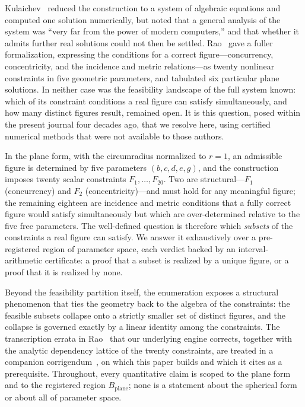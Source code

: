 \documentclass[pdflatex,sn-mathphys-num]{sn-jnl}
\newcommand{\Bplane}{B_{\mathrm{plane}}}
\begin{document}
Kulaichev~\cite{Kulaichev1984} reduced the construction to a system of algebraic equations and computed one solution numerically, but noted that a general analysis of the system was ``very far from the power of modern computers,'' and that whether it admits further real solutions could not then be settled. Rao~\cite{Rao1998} gave a fuller formalization, expressing the conditions for a correct figure---concurrency, concentricity, and the incidence and metric relations---as twenty nonlinear constraints in five geometric parameters, and tabulated six particular plane solutions. In neither case was the feasibility landscape of the full system known: which of its constraint conditions a real figure can satisfy simultaneously, and how many distinct figures result, remained open. It is this question, posed within the present journal four decades ago, that we resolve here, using certified numerical methods that were not available to those authors.

In the plane form, with the circumradius normalized to $r=1$, an admissible figure is determined by five parameters $(b,c,d,e,g)$, and the construction imposes twenty scalar constraints $F_1,\dots,F_{20}$. Two are structural---$F_1$ (concurrency) and $F_2$ (concentricity)---and must hold for any meaningful figure; the remaining eighteen are incidence and metric conditions that a fully correct figure would satisfy simultaneously but which are over-determined relative to the five free parameters. The well-defined question is therefore which \emph{subsets} of the constraints a real figure can satisfy. We answer it exhaustively over a pre-registered region of parameter space, each verdict backed by an interval-arithmetic certificate: a proof that a subset is realized by a unique figure, or a proof that it is realized by none.

Beyond the feasibility partition itself, the enumeration exposes a structural phenomenon that ties the geometry back to the algebra of the constraints: the feasible subsets collapse onto a strictly smaller set of distinct figures, and the collapse is governed exactly by a linear identity among the constraints. The transcription errata in Rao~\cite{Rao1998} that our underlying engine corrects, together with the analytic dependency lattice of the twenty constraints, are treated in a companion corrigendum~\cite{Corrigendum}, on which this paper builds and which it cites as a prerequisite. Throughout, every quantitative claim is scoped to the plane form and to the registered region $\Bplane$; none is a statement about the spherical form or about all of parameter space.
\end{document}
